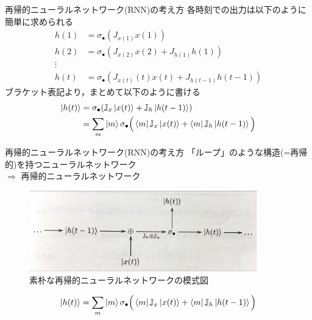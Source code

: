 \documentclass[dvipdfmx,10pt]{beamer}
\begin{document}
  \begin{frame}{再帰的ニューラルネットワーク(RNN)の考え方}
    各時刻での出力は以下のように簡単に求められる
    \begin{align*}
      h(1) &= \sigma_{\bullet}(J_{x(1)}x(1))\\
      h(2) &= \sigma_{\bullet}(J_{x(2)}x(2) + J_{h(1)}h(1))\\
      \vdots\\
      h(t) &= \sigma_{\bullet}(J_{x(t)}(t)x(t) + J_{h(t-1)}h(t-1))
    \end{align*}
    ブラケット表記より，まとめて以下のように書ける
    \begin{align*}
      \ket{h(t)} &= \sigma_{\bullet}(\mathbb{J}_x\ket{x(t)} + \mathbb{J}_h\ket{h(t-1)})\\
      &= \sum_{m}\ket{m}\sigma_{\bullet}\Big(\bra{m}\mathbb{J}_x\ket{x(t)} + \bra{m}\mathbb{J}_h\ket{h(t-1)}\Big)
    \end{align*}
  \end{frame}

  \begin{frame}{再帰的ニューラルネットワーク(RNN)の考え方}
    「ループ」のような構造(=再帰的)を持つニューラルネットワーク\\
    $\Rightarrow$ 再帰的ニューラルネットワーク
    \begin{figure}
      \begin{center}
        \includegraphics[height=3.5cm]{image/RNN_diagram.jpeg}
      \end{center}
      \caption{素朴な再帰的ニューラルネットワークの模式図} 
    \end{figure}
    \begin{equation*}
      \ket{h(t)} = \sum_{m}\ket{m}\sigma_{\bullet}\Big(\bra{m}\mathbb{J}_x\ket{x(t)} + \bra{m}\mathbb{J}_h\ket{h(t-1)}\Big)
    \end{equation*}
  \end{frame}
\end{document}
